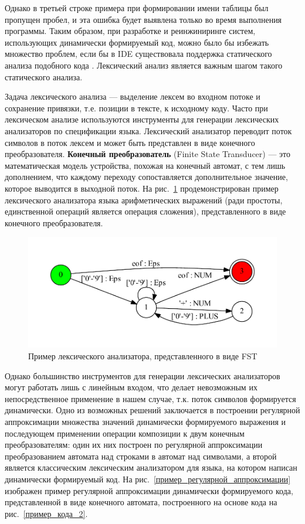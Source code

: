 \documentclass[14pt]{matmex-diploma}
\begin{document}
Однако в третьей строке примера при формировании имени таблицы был пропущен пробел, и эта ошибка будет выявлена только во время выполнения программы. Таким образом, при разработке и реинжиниринге систем, использующих динамически формируемый код, можно было бы избежать множество проблем, если бы в IDE существовала поддержка статического анализа подобного кода \cite{string_embedded}. Лексический анализ является важным шагом такого статического анализа.

Задача лексического анализа — выделение лексем во входном потоке и сохранение привязки, т.е. позиции в тексте, к исходному коду. Часто при лексическом анализе используются инструменты для генерации лексических анализаторов по спецификации языка. Лексический анализатор переводит поток символов в поток лексем и может быть представлен в виде конечного преобразователя. \textbf{Конечный преобразователь} (Finite State Transducer) — это математическая модель устройства, похожая на конечный автомат, с тем лишь дополнением, что каждому переходу сопоставляется дополнительное значение, которое выводится в выходной поток. На рис.~\ref{пример_лексического_анализатора} продемонстрирован пример лексического анализатора языка арифметических выражений (ради простоты, единственной операций является операция сложения), представленного в виде конечного преобразователя.

\begin{figure}[h]
\centering
\includegraphics{pictures/lexer.pdf}
\caption{Пример лексического анализатора, представленного в виде FST}
\label{пример_лексического_анализатора}
\end{figure}

Однако большинство инструментов для генерации лексических анализаторов могут работать лишь с линейным входом, что делает невозможным их непосредственное применение в нашем случае, т.к. поток символов формируется динамически. Одно из возможных решений \cite{polubelova} заключается в построении регулярной аппроксимации множества значений динамически формируемого выражения и последующем применении операции композиции \cite{handbook_automata} к двум конечным преобразователям: один их них построен по регулярной аппроксимации преобразованием автомата над строками в автомат над символами, а второй является классическим лексическим анализатором для языка, на котором написан динамически формируемый код. На рис.~\ref{пример_регулярной_аппроксимации} изображен пример регулярной аппроксимации динамически формируемого кода, представленной в виде конечного автомата, построенного на основе кода на рис.~\ref{пример_кода_2}. 
\end{document}
